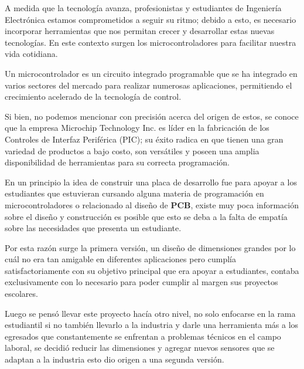 \documentclass[times, 10pt,twocolumn]{article}
\begin{document}
\raggedbottom
A medida que la tecnología avanza, profesionistas y estudiantes de Ingeniería Electrónica estamos comprometidos a seguir su ritmo; debido a esto, es necesario incorporar herramientas que nos permitan crecer y desarrollar estas nuevas tecnologías. En este contexto surgen los microcontroladores para facilitar nuestra vida cotidiana.

Un microcontrolador es un circuito integrado programable que se ha integrado en varios sectores del mercado para realizar numerosas aplicaciones, permitiendo el crecimiento acelerado de la tecnología de control.

Si bien, no podemos mencionar con precisión acerca del origen de estos, se conoce que la empresa Microchip Technology Inc. es líder en la fabricación de los Controles de Interfaz Periférica (PIC); su éxito radica en que tienen una gran variedad de productos a bajo costo, son versátiles y poseen una amplia disponibilidad de herramientas para su correcta programación.~\cite{ex1} 

En un principio la idea de construir una placa de desarrollo fue para apoyar a los estudiantes que estuvieran cursando alguna materia de programación en microcontroladores o relacionado al diseño de \textbf{PCB}, existe muy poca información sobre el diseño y construcción es posible que esto se deba a la falta de empatía sobre las necesidades que presenta un estudiante. 

Por esta razón surge la primera versión, un diseño de dimensiones grandes por lo cuál no era tan amigable en diferentes aplicaciones pero cumplía satisfactoriamente con su objetivo principal que era apoyar a estudiantes, contaba exclusivamente con lo necesario para poder cumplir al margen sus proyectos escolares. 

Luego se pensó llevar este proyecto hacía otro nivel,  no solo enfocarse en la rama estudiantil si no también llevarlo a la industria y darle una herramienta más a los egresados que constantemente se enfrentan a problemas técnicos en el campo laboral, se decidió reducir las dimensiones y agregar nuevos sensores que se adaptan a la industria esto dio origen a una segunda versión. 
\end{document}
